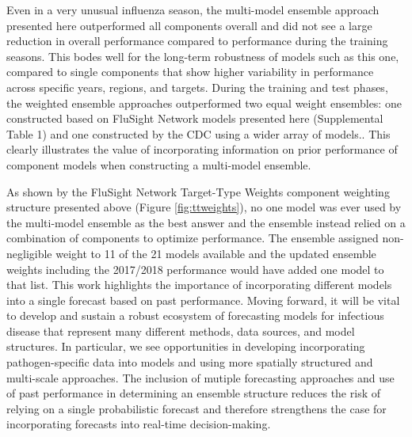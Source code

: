 \documentclass{article}\usepackage[]{graphicx}\usepackage[]{color}
\begin{document}
Even in a very unusual influenza season, the multi-model ensemble approach presented here outperformed all components overall and did not see a large reduction in overall performance compared to performance during the training seasons. 
This bodes well for the long-term robustness of models such as this one, compared to single components that show higher variability in performance across specific years, regions, and targets. 
During the training and test phases, the weighted ensemble approaches outperformed two equal weight ensembles: one constructed based on FluSight Network models presented here (Supplemental Table 1) and one constructed by the CDC using a wider array of models.\cite{McGowan2018}. 
This clearly illustrates the value of incorporating information on prior performance of component models when constructing a multi-model ensemble.

As shown by the FluSight Network Target-Type Weights component weighting structure presented above (Figure \ref{fig:ttweights}), no one model was ever used by the multi-model ensemble as the best answer and the ensemble instead relied on a combination of components to optimize performance. 
The ensemble assigned non-negligible weight to 11 of the 21 models available and the updated ensemble weights including the 2017/2018 performance would have added one model to that list. 
This work highlights the importance of incorporating different models into a single forecast based on past performance.
Moving forward, it will be vital to develop and sustain a robust ecosystem of forecasting models for infectious disease that represent many different methods, data sources, and model structures.
In particular, we see opportunities in developing incorporating pathogen-specific data into models\cite{Kandula2017type} and using more spatially structured and multi-scale approaches\cite{Pei2018,held2017probabilistic}. 
The inclusion of mutiple forecasting approaches and use of past performance in determining an ensemble structure reduces the risk of relying on a single probabilistic forecast and therefore strengthens the case for incorporating forecasts into real-time decision-making.
\end{document}
